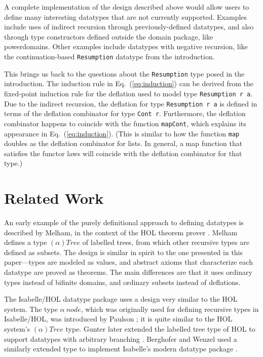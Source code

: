 \documentclass{llncs}
\begin{document}
A complete implementation of the design described above would allow
users to define many interesting datatypes that are not currently
supported.  Examples include uses of indirect recursion through
previously-defined datatypes, and also through type constructors
defined outside the domain package, like powerdomains.  Other examples
include datatypes with negative recursion, like the continuation-based
\texttt{Resumption} datatype from the introduction.

This brings us back to the questions about the \texttt{Resumption}
type posed in the introduction.  The induction rule in
Eq.~(\ref{eq:induction}) can be derived from the fixed-point induction
rule for the deflation used to model type \texttt{Resumption r a}.
Due to the indirect recursion, the deflation for type
\texttt{Resumption r a} is defined in terms of the deflation
combinator for type \texttt{Cont r}.  Furthermore, the deflation
combinator happens to coincide with the function \texttt{mapCont},
which explains its appearance in Eq.~(\ref{eq:induction}).  (This is
similar to how the function \texttt{map} doubles as the deflation
combinator for lists.  In general, a map function that satisfies the
functor laws will coincide with the deflation combinator for that
type.)

\section{\label{sec:related}Related Work}

An early example of the purely definitional approach to defining
datatypes is described by Melham, in the context of the HOL theorem
prover \cite{melham89automating}.  Melham defines a type
$(\alpha)\mathit{Tree}$ of labelled trees, from which other recursive
types are defined as subsets.  The design is similar in spirit to the
one presented in this paper---types are modeled as values, and
abstract axioms that characterize each datatype are proved as
theorems.  The main differences are that it uses ordinary types
instead of bifinite domains, and ordinary subsets instead of
deflations.

The Isabelle/HOL datatype package uses a design very similar to the
HOL system.  The type $\alpha~\mathit{node}$, which was originally
used for defining recursive types in Isabelle/HOL, was introduced
by Paulson \cite{paulson97mechanizing}; it is quite similar to the HOL
system's $(\alpha)\mathit{Tree}$ type.  Gunter later extended the
labelled tree type of HOL to support datatypes with arbitrary
branching \cite{gunter94broader}.  Berghofer and Wenzel used a
similarly extended type to implement Isabelle's modern datatype
package \cite{bw99inductivedatatypes}.
\end{document}
